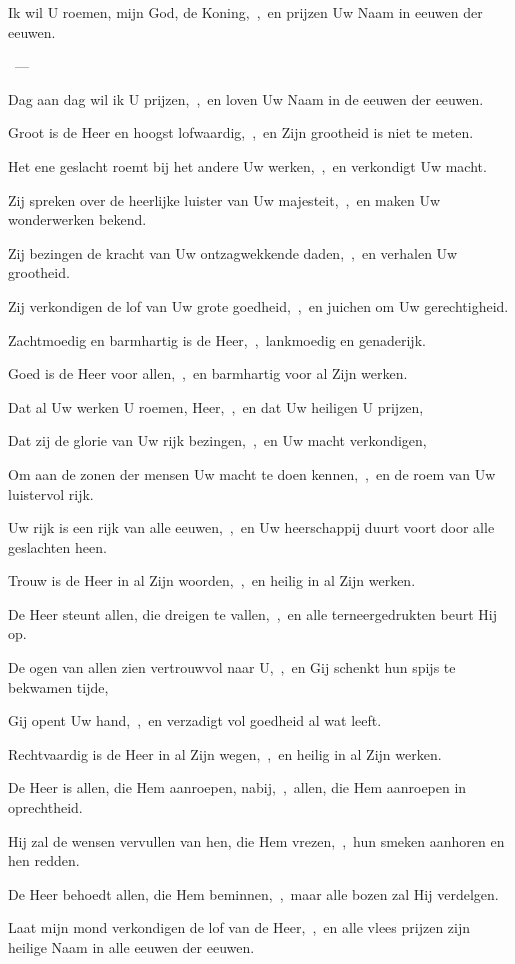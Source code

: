 \documentclass[12pt,twoside,a5paper]{article}
\begin{document}


\begin{halfparskip}
   Ik wil U roemen, mijn God, de Koning,~\sep\ en prijzen Uw Naam in eeuwen der eeuwen.

  ~--- 

  Dag aan dag wil ik U prijzen,~\sep\ en loven Uw Naam in de eeuwen der eeuwen.

  Groot is de Heer en hoogst lofwaardig,~\sep\ en Zijn grootheid is niet te meten.

  Het ene geslacht roemt bij het andere Uw werken,~\sep\ en verkondigt Uw macht.

  Zij spreken over de heerlijke luister van Uw majesteit,~\sep\ en maken Uw wonderwerken bekend.

  Zij bezingen de kracht van Uw ontzagwekkende daden,~\sep\ en verhalen Uw grootheid.

  Zij verkondigen de lof van Uw grote goedheid,~\sep\ en juichen om Uw gerechtigheid.

  Zachtmoedig en barmhartig is de Heer,~\sep\ lankmoedig en genaderijk.

  Goed is de Heer voor allen,~\sep\ en barmhartig voor al Zijn werken.

  Dat al Uw werken U roemen, Heer,~\sep\ en dat Uw heiligen U prijzen,

  Dat zij de glorie van Uw rijk bezingen,~\sep\ en Uw macht verkondigen,

  Om aan de zonen der mensen Uw macht te doen kennen,~\sep\ en de roem van Uw luistervol rijk.

  Uw rijk is een rijk van alle eeuwen,~\sep\ en Uw heerschappij duurt voort door alle geslachten heen.

  Trouw is de Heer in al Zijn woorden,~\sep\ en heilig in al Zijn werken.

  De Heer steunt allen, die dreigen te vallen,~\sep\ en alle terneergedrukten beurt Hij op.

  De ogen van allen zien vertrouwvol naar U,~\sep\ en Gij schenkt hun spijs te bekwamen tijde,

  Gij opent Uw hand,~\sep\ en verzadigt vol goedheid al wat leeft.

  Rechtvaardig is de Heer in al Zijn wegen,~\sep\ en heilig in al Zijn werken.

  De Heer is allen, die Hem aanroepen, nabij,~\sep\ allen, die Hem aanroepen in oprechtheid.

  Hij zal de wensen vervullen van hen, die Hem vrezen,~\sep\ hun smeken aanhoren en hen redden.

  De Heer behoedt allen, die Hem beminnen,~\sep\ maar alle bozen zal Hij verdelgen.

  Laat mijn mond verkondigen de lof van de Heer,~\sep\ en alle vlees prijzen zijn heilige Naam in alle eeuwen der eeuwen.
\end{halfparskip}
\end{document}
